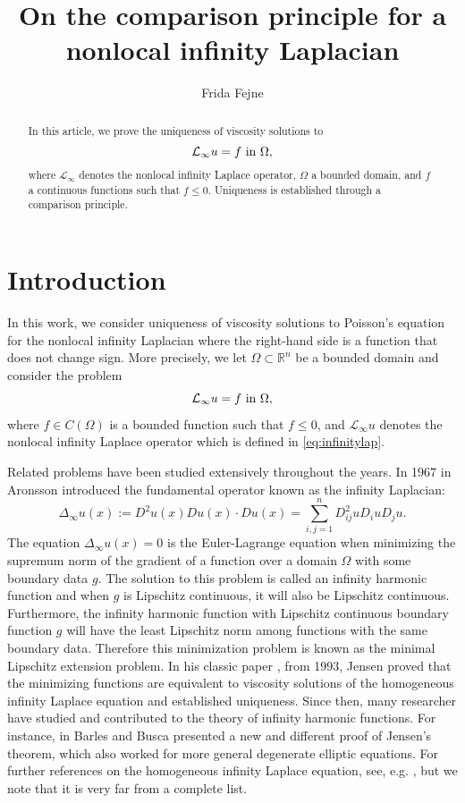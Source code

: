 \documentclass[11pt]{article}
\title{On the comparison principle for a nonlocal infinity Laplacian}
\author{Frida Fejne}
\date{ }
\providecommand{\Linf}{\mathcal{L}_{\infty}}
\providecommand{\Rn}{\mathbb{R}^n}
\numberwithin{equation}{section}
\theoremstyle{definition}
\begin{document}
\maketitle
\thispagestyle{empty}

\begin{abstract}
   \noindent In this article, we prove the uniqueness of viscosity solutions to 
    $$
    \Linf u =f  \textup{ in }  \Omega, 
    $$
    where $\Linf$ denotes the nonlocal infinity Laplace operator, $\Omega$ a bounded domain, and $f$ a continuous functions such that $f \leq 0$. Uniqueness is established through a comparison principle.
\end{abstract}

\section{Introduction}
In this work, we consider uniqueness of viscosity solutions to Poisson's equation for the nonlocal infinity Laplacian where the right-hand side is a function that does not change sign. More precisely, we let $\Omega \subset \Rn$ be a bounded domain and consider the problem
\begin{equation}\label{eq:Luf}   
\Linf u =f  \textup{ in }  \Omega, 
\end{equation}
where $f \in C(\Omega)$ is a bounded function such that $f \leq 0$, and $\Linf u$ denotes the nonlocal infinity Laplace operator which is defined in \eqref{eq:infinitylap}.

Related problems have been studied extensively throughout the years. In 1967 in \cite{A1967} Aronsson introduced the fundamental operator known as the infinity Laplacian:
\begin{equation*}
    \Delta_{\infty} u(x) := D^2 u(x) Du(x) \cdot Du(x) =\sum_{i,j=1}^n D^2_{ij}u D_i u D_j u.
\end{equation*}
The equation $\Delta_{\infty} u(x)=0$ is the Euler-Lagrange equation when minimizing the supremum norm of the gradient of a function over a domain $\Omega$ with some boundary data $g$. The solution to this problem is called an infinity harmonic function and when $g$ is Lipschitz continuous, it will also be Lipschitz continuous. Furthermore, the infinity harmonic function with Lipschitz continuous boundary function $g$ will have the least Lipschitz norm among functions with the same boundary data. Therefore this minimization problem is known as the minimal Lipschitz extension problem. In his classic paper \cite{Jensen1993}, from 1993, Jensen proved that the minimizing functions are equivalent to viscosity solutions of the homogeneous infinity Laplace equation and established uniqueness. Since then, many researcher have studied and contributed to the theory of infinity harmonic functions. For instance, in \cite{BB2001} Barles and Busca presented a new and different proof of Jensen's theorem, which also worked for more general degenerate elliptic equations. For further references on the homogeneous infinity Laplace equation, see, e.g. \cite{AS2010, CEG2001, CGW2007, J1998, LM1995}, but we note that it is very far from a complete list.
\end{document}
